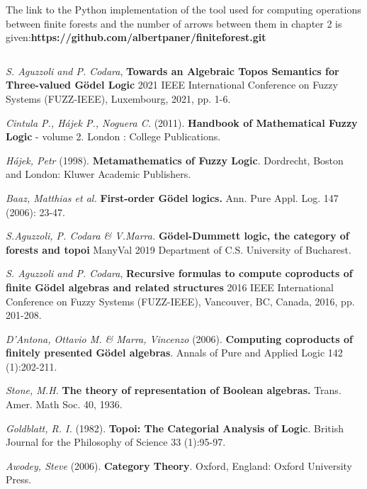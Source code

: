 The link to the Python implementation of the tool used for computing operations between finite forests and the number of arrows between them in chapter 2 is given:\newline\newline \textbf{https://github.com/albertpaner/finiteforest.git}

	\newpage
${}$ \newpage

\begin{thebibliography}{30}
	\emph{S. Aguzzoli and P. Codara}, \textbf{Towards an Algebraic Topos Semantics for Three-valued Gödel Logic} 2021 IEEE International Conference on Fuzzy Systems (FUZZ-IEEE), Luxembourg, 2021, pp. 1-6.
	
	\emph{Cintula P., Hájek P., Noguera C.} (2011).\textbf{ Handbook of Mathematical Fuzzy Logic} - volume 2. London : College Publications.
	
	\emph{Hájek, Petr} (1998). \textbf{Metamathematics of Fuzzy Logic}. Dordrecht, Boston and London: Kluwer Academic Publishers.
	
	\emph{Baaz, Matthias et al.} \textbf{First-order Gödel logics.} Ann. Pure Appl. Log. 147 (2006): 23-47.
	
	\emph{S.Aguzzoli, P. Codara \& V.Marra.} \textbf{Gödel-Dummett logic, the category of forests and topoi} 
	ManyVal 2019 Department of C.S. University of Bucharest.
	
	\emph{S. Aguzzoli and P. Codara}, \textbf{Recursive formulas to compute coproducts of finite Gödel algebras and related structures} 2016 IEEE International Conference on Fuzzy Systems (FUZZ-IEEE), Vancouver, BC, Canada, 2016, pp. 201-208.
	
	\emph{D’Antona, Ottavio M. \& Marra, Vincenzo} (2006). \textbf{Computing coproducts of finitely presented Gödel algebras}. Annals of Pure and Applied Logic 142 (1):202-211.
	
	\emph{Stone, M.H.} \textbf{The theory of representation of Boolean algebras.} Trans. Amer. Math Soc. 40, 1936.
	
	\emph{Goldblatt, R. I.} (1982). \textbf{Topoi: The Categorial Analysis of Logic}. British Journal for the Philosophy of Science 33 (1):95-97.
	
	\emph{Awodey, Steve} (2006). \textbf{Category Theory}. Oxford, England: Oxford University Press.
	

\end{thebibliography}

